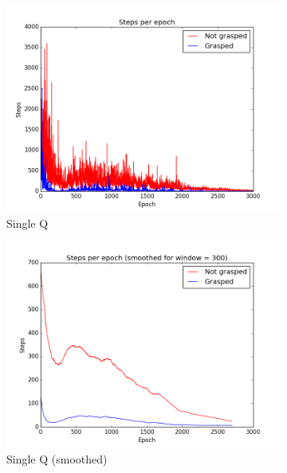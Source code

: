\begin{figure}
	\centering
	\begin{subfigure}{.48\textwidth}
		\centering
		\includegraphics[width=\textwidth]{images/SingleQ.png}
		\caption{Single Q}
	\end{subfigure}
	\begin{subfigure}{0.48\textwidth}
		\centering
		\includegraphics[width=\textwidth]{images/SingleQ_smoothed.png}
		\caption{Single Q (smoothed)}
	\end{subfigure}
	\begin{subfigure}{.48\textwidth}
		\centering

\end{subfigure}
\end{figure}
